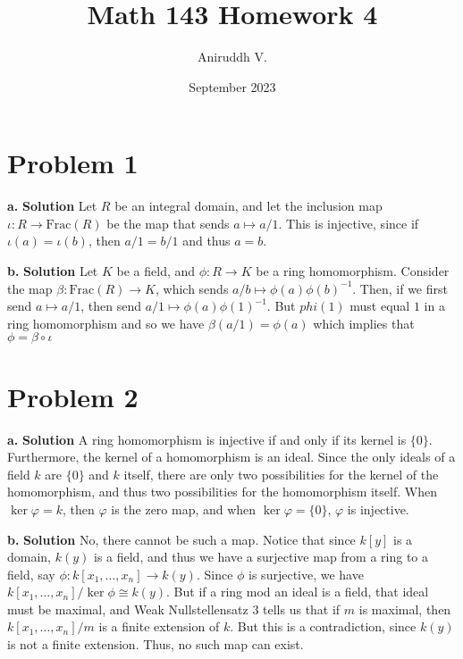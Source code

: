 \documentclass{article}
\title{Math 143 Homework 4}
\author{Aniruddh V.}
\date{September 2023}
\begin{document}
\maketitle

\section{Problem 1}
\textbf{a. } \textbf{Solution } Let $R$ be an integral domain, and let the inclusion map $\iota : R \to \text{Frac}(R)$ be the map that sends $a \mapsto a/1$. 
This is injective, since if $\iota(a) = \iota(b)$, then $a /1 = b/1 $ and thus $a = b$.

\textbf{b. } \textbf{Solution } Let $K$ be a field, and $\phi : R \to K$ be a ring homomorphism. Consider the map $\beta : \text{Frac}(R) \to K$, which sends 
$a/b \mapsto \phi(a)\phi(b)^{-1}$. Then, if we first send $a \mapsto a/1$, then send $a/1 \mapsto \phi(a)\phi(1)^{-1}$. But $phi(1)$ must equal $1$ in a ring homomorphism
and so we have $\beta(a/1) = \phi(a)$ which implies that $\phi = \beta \circ \iota$

\section{Problem 2}
\textbf{a. } \textbf{Solution} A ring homomorphism is injective if and only if its kernel is $\{0\}.$ Furthermore, the kernel of a homomorphism is an ideal. Since the only ideals
of a field $k$ are $\{0\}$ and $k$ itself, there are only two possibilities for the kernel of the homomorphism, and thus two possibilities for the homomorphism itself. 
When $\ker \varphi = k$, then $\varphi$ is the zero map, and when $\ker \varphi = \{0\}$, $\varphi$ is injective.

\textbf{b. } \textbf{Solution} No, there cannot be such a map. Notice that since $k[y]$ is a domain, $k(y)$ is a field, and thus we have a surjective map from a ring to a field, say $\phi : k[x_1, \ldots, x_n] \to k(y)$.
Since $\phi$ is surjective, we have $k[x_1, \ldots, x_n] / \ker \phi \cong k(y)$. But if a ring mod an ideal is a field, that ideal must be maximal, and Weak Nullstellensatz 3 tells us 
that if $m$ is maximal, then $k[x_1, \ldots, x_n] / m$ is a finite extension of $k$. But this is a contradiction, since $k(y)$ is not a finite extension. Thus, no such map can exist. 
\end{document}
